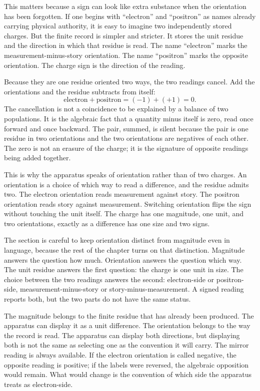 This matters because a sign can look like extra substance when the orientation
has been forgotten. If one begins with ``electron'' and ``positron'' as names
already carrying physical authority, it is easy to imagine two independently
stored charges. But the finite record is simpler and stricter. It stores the
unit residue and the direction in which that residue is read. The name
``electron'' marks the measurement-minus-story orientation. The name
``positron'' marks the opposite orientation. The charge sign is the direction of
the reading.

Because they are one residue oriented two ways, the two readings cancel. Add
the orientations and the residue subtracts from itself:
\[
  \text{electron} + \text{positron} = (-1) + (+1) = 0.
\]
The cancellation is not a coincidence to be explained by a balance of two
populations. It is the algebraic fact that a quantity minus itself is zero,
read once forward and once backward. The pair, summed, is silent because the
pair is one residue in two orientations and the two orientations are negatives
of each other. The zero is not an erasure of the charge; it is the signature of
opposite readings being added together.

This is why the apparatus speaks of orientation rather than of two charges. An
orientation is a choice of which way to read a difference, and the residue
admits two. The electron orientation reads measurement against story. The
positron orientation reads story against measurement. Switching orientation
flips the sign without touching the unit itself. The charge has one magnitude,
one unit, and two orientations, exactly as a difference has one size and two
signs.

The section is careful to keep orientation distinct from magnitude even in
language, because the rest of the chapter turns on that distinction. Magnitude
answers the question how much. Orientation answers the question which way. The
unit residue answers the first question: the charge is one unit in size. The
choice between the two readings answers the second: electron-side or
positron-side, measurement-minus-story or story-minus-measurement. A signed
reading reports both, but the two parts do not have the same status.

The magnitude belongs to the finite residue that has already been produced.
The apparatus can display it as a unit difference. The orientation belongs to
the way the record is read. The apparatus can display both directions, but
displaying both is not the same as selecting one as the convention it will
carry. The mirror reading is always available. If the electron orientation is
called negative, the opposite reading is positive; if the labels were reversed,
the algebraic opposition would remain. What would change is the convention of
which side the apparatus treats as electron-side.

